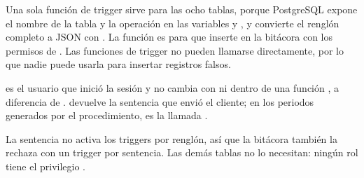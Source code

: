 Una sola función de trigger sirve para las ocho tablas, porque PostgreSQL expone el nombre de la tabla y la operación en las variables  y , y convierte el renglón completo a JSON con . La función es  para que inserte en la bitácora con los permisos de . Las funciones de trigger no pueden llamarse directamente, por lo que nadie puede usarla para insertar registros falsos.

 es el usuario que inició la sesión y no cambia con  ni dentro de una función , a diferencia de .  devuelve la sentencia que envió el cliente; en los periodos generados por el procedimiento, es la llamada .

La sentencia  no activa los triggers por renglón, así que la bitácora también la rechaza con un trigger por sentencia. Las demás tablas no lo necesitan: ningún rol tiene el privilegio .

